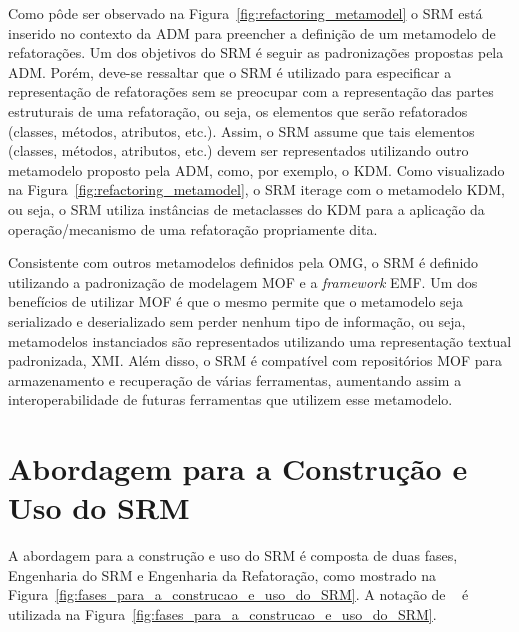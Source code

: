 Como pôde ser observado na Figura~\ref{fig:refactoring_metamodel} o SRM está inserido no contexto da ADM para preencher a definição de um metamodelo de refatorações. Um dos objetivos do SRM é seguir as padronizações propostas pela ADM. Porém, deve-se ressaltar que o SRM é utilizado para especificar a representação de refatorações sem se preocupar com a representação das partes estruturais de uma refatoração, ou seja, os elementos que serão refatorados (classes, métodos, atributos, etc.). Assim, o SRM assume que tais elementos (classes, métodos, atributos, etc.) devem ser representados utilizando outro metamodelo proposto pela ADM, como, por exemplo, o KDM. Como visualizado na Figura~\ref{fig:refactoring_metamodel}, o SRM iterage com o metamodelo KDM, ou seja, o SRM utiliza instâncias de metaclasses do KDM para a aplicação da operação/mecanismo de uma refatoração propriamente dita.

Consistente com outros metamodelos definidos pela OMG, o SRM é definido utilizando a padronização  de modelagem MOF e a \textit{framework} EMF. Um dos benefícios de utilizar MOF é que o mesmo permite que o metamodelo seja serializado e deserializado sem perder nenhum tipo de informação, ou seja, metamodelos instanciados são representados utilizando uma representação textual padronizada, XMI. Além disso, o SRM é compatível com repositórios MOF para armazenamento e recuperação de várias ferramentas, aumentando assim a interoperabilidade de futuras ferramentas que utilizem esse metamodelo.

\section{Abordagem para a Construção e Uso do SRM}\label{abordagem_para_a_construcao_e_uso_do_SRM}

A abordagem para a construção e uso do SRM é composta de duas fases, Engenharia do SRM e Engenharia da Refatoração, como mostrado na Figura~\ref{fig:fases_para_a_construcao_e_uso_do_SRM}. A notação de ~\cite{Marca_1987} é utilizada na Figura~\ref{fig:fases_para_a_construcao_e_uso_do_SRM}.

